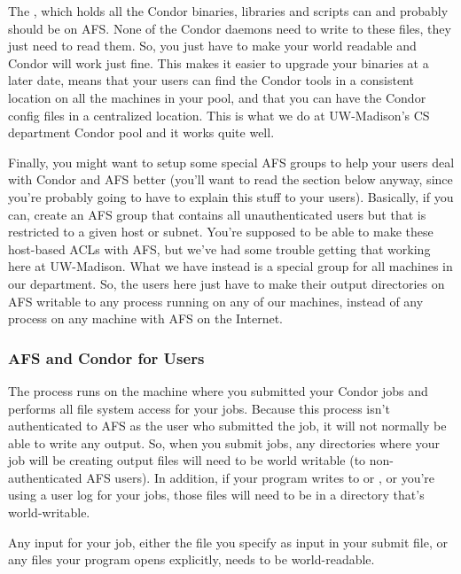 The , which holds all the Condor binaries,
libraries and scripts can and probably should be on AFS.  None of the
Condor daemons need to write to these files, they just need to read
them.  So, you just have to make your  world
readable and Condor will work just fine.  This makes it easier to
upgrade your binaries at a later date, means that your users can find
the Condor tools in a consistent location on all the machines in your
pool, and that you can have the Condor config files in a centralized
location.  This is what we do at UW-Madison's CS department Condor
pool and it works quite well.

Finally, you might want to setup some special AFS groups to help your
users deal with Condor and AFS better (you'll want to read the section
below anyway, since you're probably going to have to explain this
stuff to your users).  Basically, if you can, create an AFS group that
contains all unauthenticated users but that is restricted to a given
host or subnet.  You're supposed to be able to make these host-based
ACLs with AFS, but we've had some trouble getting that working here at
UW-Madison.  What we have instead is a special group for all machines
in our department.  So, the users here just have to make their output
directories on AFS writable to any process running on any of our
machines, instead of any process on any machine with AFS on the
Internet.

\subsubsection{AFS and Condor for Users}
\label{sec:Condor-AFS-Users}

The  process runs on the machine where you submitted
your Condor jobs and performs all file system access for your jobs.
Because this process isn't authenticated to AFS as the user who
submitted the job, it will not normally be able to write any output.
So, when you submit jobs, any directories where your job will be
creating output files will need to be world writable (to
non-authenticated AFS users).  In addition, if your program writes to
 or , or you're using a user log for your
jobs, those files will need to be in a directory that's
world-writable.

Any input for your job, either the file you specify as input in your
submit file, or any files your program opens explicitly, needs to be
world-readable.

